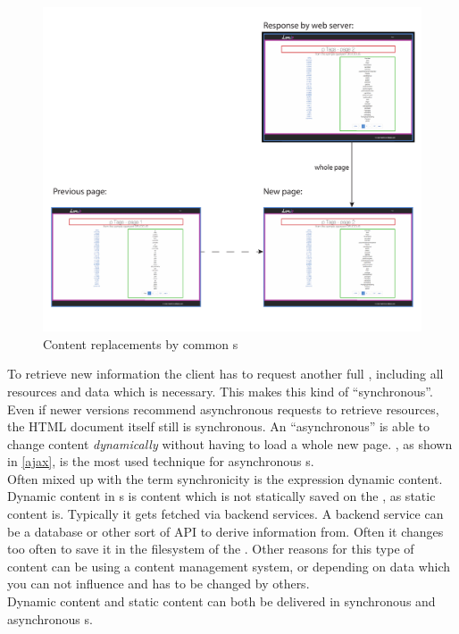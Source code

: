 \begin{figure}[H]
\centering
\includegraphics[width=12cm]{images/http_replacements.pdf}
\caption[ajax_replacements]{Content replacements by common \httpRequest{}s}
\label{fig:ajax_replacements}
\end{figure}

\noindent{}To retrieve new information the client has to request another full \webPage{}, including all resources and data which is necessary.
This makes this kind of \webSite{} \enquote{synchronous}.
Even if newer \http{} versions recommend asynchronous requests to retrieve resources, the HTML document itself still is synchronous. 
An \enquote{asynchronous} \webSite{} is able to change content \emph{dynamically} without having to load a whole new page.
\ajax{}, as shown in \ref{ajax}, is the most used technique for asynchronous \webSite{}s.
\\
Often mixed up with the term synchronicity is the expression dynamic content.
Dynamic content in \webSite{}s is content which is not statically saved on the \webServer{}, as static content is.
Typically it gets fetched via backend services.
A backend service can be a database or other sort of API to derive information from.
Often it changes too often to save it in the filesystem of the \webServer{}.
Other reasons for this type of content can be using a content management system, or depending on data which you can not influence and has to be changed by others.
\\
Dynamic content and static content can both be delivered in synchronous and asynchronous \webApplication{}s.


